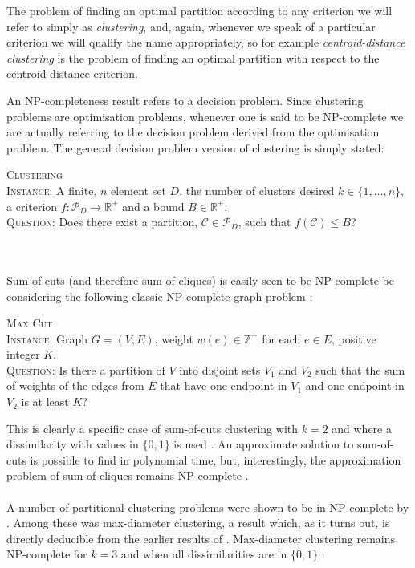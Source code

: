 \documentclass[a4paper]{report}
\newcommand{\dset}{D}
\newcommand{\clus}{\mathcal{C}}
\newcommand{\parts}{\mathcal{P}}
\newenvironment{problem}[1]{\par\addvspace{\topsep}\noindent\textsc{#1}\\}
{\par\addvspace{\topsep}\noindent}
\newcommand{\instance}[1]{\textsc{Instance:} #1\\}
\newcommand{\question}[1]{\textsc{Question:} #1}
\begin{document}
The problem of finding an optimal partition according to any criterion we will
refer to simply as \textit{clustering}, and, again, whenever we speak of a
particular criterion we will qualify the name appropriately, so for example
\textit{centroid-distance clustering} is the problem of finding an optimal
partition with respect to the centroid-distance criterion.

An NP-completeness result refers to a decision problem.  Since clustering
problems are optimisation problems, whenever one is said to be NP-complete we
are actually referring to the decision problem derived from the optimisation
problem.  The general decision problem version of clustering is simply stated:
\begin{problem}{Clustering}
  \instance{A finite, $n$ element set $\dset$, the number of clusters desired
    $k \in \{1,\dotsc,n\}$, a criterion $f \colon \parts_{\dset} \to
    \mathbb{R}^+$ and a bound $B \in \mathbb{R}^+$.}
  \question{Does there exist a partition, $\clus \in \parts_{\dset}$, such
    that $f(\clus) \leq B$?}
\end{problem}
\\\\
\noindent Sum-of-cuts (and therefore sum-of-cliques) is easily seen to be
NP-complete be considering the following classic NP-complete graph problem
\citep{karp72twentyone,gonzalez1982computational}:
\begin{problem}{Max Cut}
  \instance{Graph $G=(V,E)$, weight $w(e) \in \mathbb{Z}^+$ for each $e \in
    E$, positive integer $K$.}
  \question{Is there a partition of $V$ into disjoint sets $V_1$ and $V_2$
    such that the sum of weights of the edges from $E$ that have one endpoint
    in $V_1$ and one endpoint in $V_2$ is at least $K$?}
\end{problem}This is clearly a specific case of sum-of-cuts clustering with
$k=2$ and where a dissimilarity with values in $\{0,1\}$ is used
\citep{garey76simplified}.  An approximate solution to sum-of-cuts is possible
to find in polynomial time, but, interestingly, the approximation problem of
sum-of-cliques remains NP-complete \citep{sahni1976p}.
\\\\
\noindent A number of partitional clustering problems were shown to be in
NP-complete by \citet{brucker1978complexity}.  Among these was max-diameter
clustering, a result which, as it turns out, is directly deducible from the
earlier results of \citet{sahni1976p}.  Max-diameter clustering remains
NP-complete for $k=3$ and when all dissimilarities are in $\{0,1\}$
\citep{gareyjohnson79}.
\end{document}
